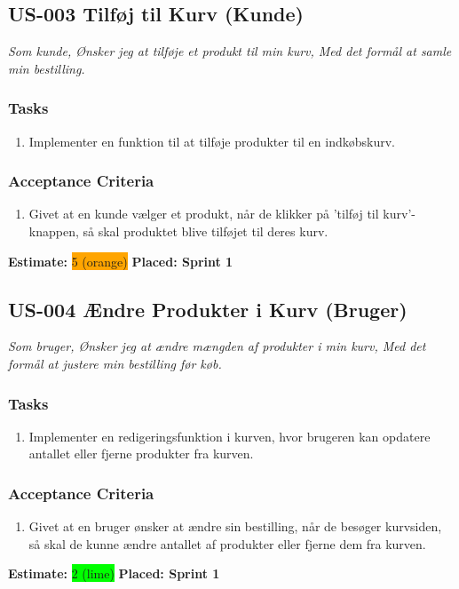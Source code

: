 \subsection{US-003 Tilføj til Kurv (Kunde)}
\label{sec:US-003}
\textit{Som kunde, Ønsker jeg at tilføje et produkt til min kurv, Med det formål at samle min bestilling.}
\subsubsection*{\textbf{Tasks}}
\begin{enumerate}
  \item Implementer en funktion til at tilføje produkter til en indkøbskurv.
\end{enumerate}
\subsubsection*{\textbf{Acceptance Criteria}}
\begin{enumerate}
  \item Givet at en kunde vælger et produkt, når de klikker på 'tilføj til kurv'-knappen, så skal produktet blive tilføjet til deres kurv.
\end{enumerate}
\textbf{Estimate:} \colorbox{orange}{5 (orange)}
\textbf{Placed: Sprint 1}
\par\noindent\dotfill

\subsection{US-004 Ændre Produkter i Kurv (Bruger)}
\label{sec:US-004}
\textit{Som bruger, Ønsker jeg at ændre mængden af produkter i min kurv, Med det formål at justere min bestilling før køb.}
\subsubsection*{\textbf{Tasks}}
\begin{enumerate}
  \item Implementer en redigeringsfunktion i kurven, hvor brugeren kan opdatere antallet eller fjerne produkter fra kurven.
\end{enumerate}
\subsubsection*{\textbf{Acceptance Criteria}}
\begin{enumerate}
  \item Givet at en bruger ønsker at ændre sin bestilling, når de besøger kurvsiden, så skal de kunne ændre antallet af produkter eller fjerne dem fra kurven.
\end{enumerate}
\textbf{Estimate:} \colorbox{lime}{2 (lime)}
\textbf{Placed: Sprint 1}
\par\noindent\dotfill

